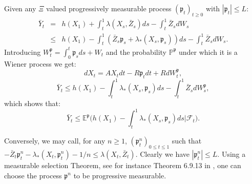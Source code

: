 \documentclass[reqno,a4paper,11 pt]{article}
\def \E {\mathbb{E}}
\numberwithin{equation}{section}
\begin{document}
Given any $\Xi$ valued progressively measurable process $(\mathfrak{p}_t)_{t\geq 0}$ with $|\mathfrak{p}_t|\leq L$:
$$\begin{array}{rcl}
\bar{Y}_t &=& \displaystyle h(X_1)+\int_t^1 \lambda(X_s,\bar{Z}_s)ds -\int_t^1 \bar{Z}_sdW_s \\ &\leq& h(X_1) \displaystyle -\int_t^1 \left(\bar{Z}_s \mathfrak{p}_s+\lambda_*(X_s, \mathfrak{p}_s)\right) ds -\int_t^1 \bar{Z}_sdW_s.\end{array} $$
Introducing $W^{\mathfrak{p}}_t=\displaystyle \int_0^t \mathfrak{p}_s ds + W_t$ and the probability $\mathbb{P}^{\mathfrak{p}}$ under which it is a Wiener process we get:
$$dX_t=AX_t dt -R\mathfrak{p}_t dt +R dW^{\mathfrak{p}}_t,$$
$$\bar{Y}_t\leq h(X_1) -\int_t^1 \lambda_*(X_s, \mathfrak{p}_s) ds -\int_t^1 \bar{Z}_sdW^{\mathfrak{p}}_s,$$
which shows that: %
\begin{equation*}
\bar{Y}_{t} \leq \E^{\mathfrak{p}} \biggl( h(X_{1}) - \int_{t}^1 \lambda_*(X_{s},\mathfrak{p}_{s}) ds \bigg | \mathcal{F}_t\biggr).
\end{equation*}
\vskip 4pt

Conversely, we may call, for any $n \geq 1$, 
$(\mathfrak{p}_{t}^n)_{0 \leq t \leq 1}$ such that %
 $ - \bar Z_{t}\mathfrak{p}_{t}^n - \lambda_*(X_{t},\mathfrak{p}_{t}^n)-1/n\leq \lambda (X_{t},\bar{Z}_{t})$. Clearly we have $|\mathfrak{p}_{t}^n | \leq L$. Using a measurable selection Theorem, see for instance Theorem 6.9.13 in \cite{Bog}, one can choose the process $\mathfrak{p}^n$ to be progressive measurable. 
\end{document}
